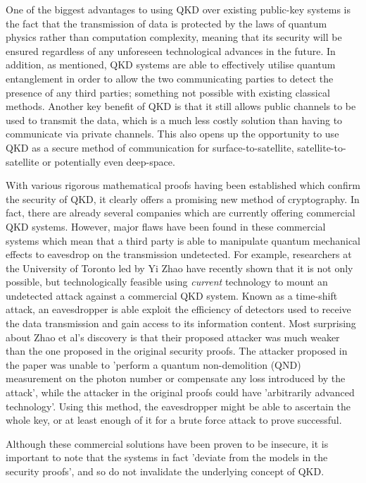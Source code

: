 \documentclass[runningheads,a4paper]{llncs}
\begin{document}
One of the biggest advantages to using QKD over existing public-key systems is the fact that the transmission of data is protected by the laws of quantum physics rather than computation complexity, meaning that its security will be ensured regardless of any unforeseen technological advances in the future. In addition, as mentioned, QKD systems are able to effectively utilise quantum entanglement in order to allow the two communicating parties to detect the presence of any third parties; something not possible with existing classical methods. Another key benefit of QKD is that it still allows public channels to be used to transmit the data, which is a much less costly solution than having to communicate via private channels. This also opens up the opportunity to use QKD as a secure method of communication for surface-to-satellite, satellite-to-satellite or potentially even deep-space\cite{Hughes:2000uq}.

With various rigorous mathematical proofs having been established which confirm the security of QKD\cite{Deutsch:1996fk}\cite{Shor:2000uq}, it clearly offers a promising new method of cryptography. In fact, there are already several companies which are currently offering commercial QKD systems. However, major flaws have been found in these commercial systems which mean that a third party is able to manipulate quantum mechanical effects to eavesdrop on the transmission undetected\cite{Wiechers:2011fk}\cite{Zhao:2008fk}. For example, researchers at the University of Toronto led by Yi Zhao have recently shown that it is not only possible, but technologically feasible using \emph{current} technology to mount an undetected attack against a commercial QKD system. Known as a time-shift attack, an eavesdropper is able exploit the efficiency of detectors used to receive the data transmission and gain access to its information content. Most surprising about Zhao et al's discovery is that their proposed attacker was much weaker than the one proposed in the original security proofs. The attacker proposed in the paper was unable to 'perform a quantum non-demolition (QND) measurement on the photon number or compensate any loss introduced by the attack', while the attacker in the original proofs could have 'arbitrarily advanced technology'. Using this method, the eavesdropper might be able to ascertain the whole key, or at least enough of it for a brute force attack to prove successful. 

Although these commercial solutions have been proven to be insecure, it is important to note that the systems in fact 'deviate from the models in the security proofs'\cite{Lydersen:2010qy}, and so do not invalidate the underlying concept of QKD. 
\end{document}
